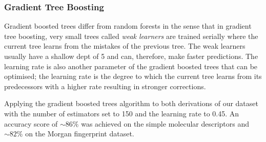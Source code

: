 \documentclass[a4paper,12pt]{report}
\begin{document}
			\subsubsection{Gradient Tree Boosting}
			Gradient boosted trees differ from random forests in the sense that in gradient tree boosting, very small trees called \textit{weak learners} are trained serially where the current tree learns from the mistakes of the previous tree. The weak learners usually have a shallow dept of 5 and can, therefore, make faster predictions. The learning rate is also another parameter of the gradient boosted trees that can be optimised; the learning rate is the degree to which the current tree learns from its predecessors \cite{Mueller2016} with a higher rate resulting in stronger corrections.
			
			Applying the gradient boosted trees algorithm to both derivations of our dataset with
			the number of estimators set to 150 and the learning rate to 0.45. An accuracy score of $\sim86\%$ was achieved on the simple molecular descriptors and $\sim82\%$ on the Morgan fingerprint dataset.
				
		
		
\end{document}
